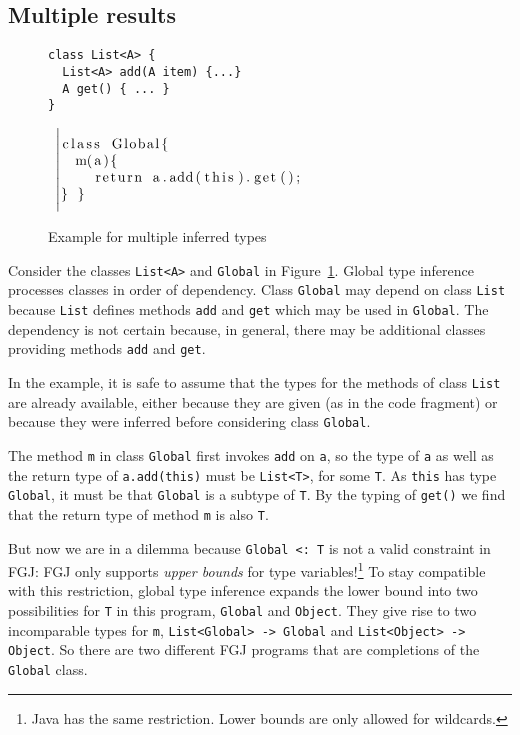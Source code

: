 \subsection{Multiple results}
\label{sec:multiple-results}
\begin{figure}[tp]
  \begin{minipage}{0.49\linewidth}
\begin{lstlisting}
class List<A> {
  List<A> add(A item) {...}
  A get() { ... }
}
\end{lstlisting}
  \end{minipage}
  ~$\left|
  \begin{minipage}{0.49\linewidth}
\begin{lstlisting}
class Global{
  m(a){
    return a.add(this).get();
} }
\end{lstlisting}
  \end{minipage}\right.$
  \caption{Example for multiple inferred types}
  \label{fig:example-types-not-unique}
\end{figure}
Consider the classes \texttt{List<A>} and \texttt{Global} in Figure~\ref{fig:example-types-not-unique}.
Global type inference processes classes in order of
dependency. Class \texttt{Global} may depend on
class \texttt{List} because \texttt{List} defines methods \texttt{add} and
\texttt{get} which may be used in \texttt{Global}. The dependency is
not certain because, in general, there may be additional classes
providing methods \texttt{add} and \texttt{get}.

In the example, it is safe to assume that the types for the methods of class \texttt{List}
are already available, either because they are given (as in the code
fragment) or because they were inferred before considering class \texttt{Global}.

The method \texttt{m} in class \texttt{Global} first invokes
\texttt{add} on \texttt{a}, so the type of \texttt{a} as well as the
return type of \texttt{a.add(this)} must be
\texttt{List<T>}, for some \texttt{T}. As \texttt{this} has
type \texttt{Global}, it must be that \texttt{Global} is a
subtype of \texttt{T}. By the typing of \texttt{get()} we find that
the return type of method \texttt{m} is also \texttt{T}.

But now we are in a dilemma because \texttt{Global <: T} is not a
valid constraint in FGJ: FGJ only supports \emph{upper bounds} for
type variables!\footnote{Java has the same restriction. Lower bounds
  are only allowed for wildcards.}
To stay compatible with this restriction, global type inference
expands the lower bound into two possibilities for
\texttt{T} in this program, \texttt{Global} and
\texttt{Object}.  They give rise to two incomparable types for
\texttt{m}, \texttt{List<Global> -> Global} and
\texttt{List<Object> -> Object}. So there are two different FGJ
programs that are completions of the \texttt{Global} class.


